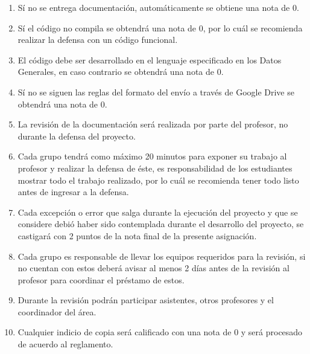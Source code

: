 \documentclass{article}
\providecommand{\tightlist}{%
          \setlength{\itemsep}{0pt}\setlength{\parskip}{0pt}}
\begin{document}
\begin{enumerate}
\def\labelenumi{\arabic{enumi}.}
\tightlist
\item
  Sí no se entrega documentación, automáticamente se obtiene una nota de
  0.
\item
  Sí el código no compila se obtendrá una nota de 0, por lo cuál se
  recomienda realizar la defensa con un código funcional.
\item
  El código debe ser desarrollado en el lenguaje especificado en los
  Datos Generales, en caso contrario se obtendrá una nota de 0.
\item
  Sí no se siguen las reglas del formato del envío a través de Google
  Drive se obtendrá una nota de 0.
\item
  La revisión de la documentación será realizada por parte del profesor,
  no durante la defensa del proyecto.
\item
  Cada grupo tendrá como máximo 20 minutos para exponer su trabajo al
  profesor y realizar la defensa de éste, es responsabilidad de los
  estudiantes mostrar todo el trabajo realizado, por lo cuál se
  recomienda tener todo listo antes de ingresar a la defensa.
\item
  Cada excepción o error que salga durante la ejecución del proyecto y
  que se considere debió haber sido contemplada durante el desarrollo
  del proyecto, se castigará con 2 puntos de la nota final de la
  presente asignación.
\item
  Cada grupo es responsable de llevar los equipos requeridos para la
  revisión, si no cuentan con estos deberá avisar al menos 2 días antes
  de la revisión al profesor para coordinar el préstamo de estos.
\item
  Durante la revisión podrán participar asistentes, otros profesores y
  el coordinador del área.
\item
  Cualquier indicio de copia será calificado con una nota de 0 y será
  procesado de acuerdo al reglamento.
\end{enumerate}

~\vfill

\end{document}
